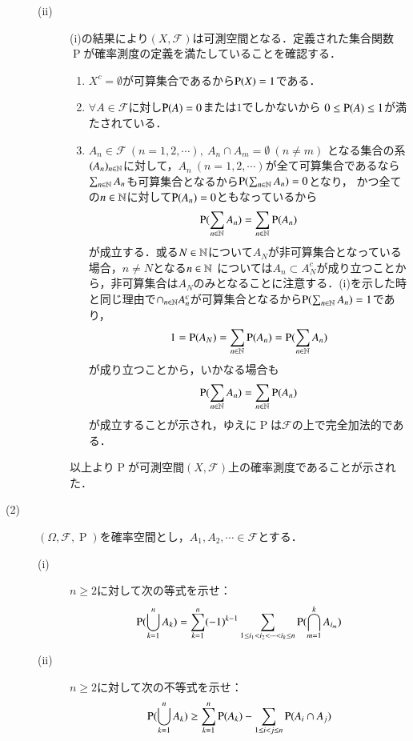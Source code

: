 \begin{description}
\begin{description}
			\item[\rm{(ii)}] (i)の結果により$(X, \mathcal{F})$は可測空間となる．定義された集合関数
				$\operatorname{P}$が確率測度の定義を満たしていることを確認する．
				\begin{enumerate}
					\item $X^c = \emptyset$が可算集合であるから$\operatorname{P} (X)=1$である．
					\item $\forall A \in \mathcal{F}$に対し$\operatorname{P} (A)= 0$または$1$でしかないから
						$0 \leq \operatorname{P} (A) \leq 1$が満たされている．
					\item $A_n \in \mathcal{F}\ (n = 1,2,\cdots),\ A_n \cap A_m = \emptyset\ (n \neq m)$
						となる集合の系$(A_n)_{n \in \mathbb{N}}$に対して，$A_n\ (n=1,2,\cdots)$が全て可算集合であるなら
						$\sum_{n \in \mathbb{N}} A_n$も可算集合となるから$\operatorname{P} (\sum_{n \in \mathbb{N}} A_n) = 0$となり，
						かつ全ての$n \in \mathbb{N}$に対して$\operatorname{P} (A_n)=0$ともなっているから
						\begin{align}
							\operatorname{P} (\sum_{n \in \mathbb{N}} A_n) = \sum_{n \in \mathbb{N}} \operatorname{P} (A_n)
						\end{align}
						が成立する．或る$N \in \mathbb{N}$について$A_N$が非可算集合となっている場合，$n \neq N$となる$n \in \mathbb{N}$
						については$A_n \subset A_N^c$が成り立つことから，非可算集合は$A_N$のみとなることに注意する．(i)を示した時と同じ理由で$\cap_{n \in \mathbb{N}}A_n^c$が可算集合となるから$\operatorname{P} (\sum_{n \in \mathbb{N}}A_n)=1$であり，
						\begin{align}
							1 = \operatorname{P} (A_N) = \sum_{n \in \mathbb{N}} \operatorname{P} (A_n) = \operatorname{P} (\sum_{n \in \mathbb{N}}A_n)
						\end{align}
						が成り立つことから，いかなる場合も
						\begin{align}
							\operatorname{P} (\sum_{n \in \mathbb{N}} A_n) = \sum_{n \in \mathbb{N}} \operatorname{P} (A_n)
						\end{align}
						が成立することが示され，ゆえに$\operatorname{P}$は$\mathcal{F}$の上で完全加法的である．
				\end{enumerate}
				以上より$\operatorname{P}$が可測空間$(X, \mathcal{F})$上の確率測度であることが示された．
				\QED
		\end{description}
	\item[(2)] $(\Omega,\mathcal{F},\operatorname{P})$を確率空間とし，$A_1,A_2,\cdots \in \mathcal{F}$とする．
	\begin{description}
		\item[\rm{(i)}] $n \geq 2$に対して次の等式を示せ：
			\begin{align}
				\operatorname{P} (\bigcup_{k=1}^{n}A_k) = \sum_{k=1}^{n}(-1)^{k-1} \sum_{1 \leq i_1 < i_2 < \cdots < i_k \leq n} \operatorname{P} (\bigcap_{m=1}^{k}A_{i_m}) \label{eq:prob_Q1_1}
			\end{align}
		\item[\rm{(ii)}] $n \geq 2$に対して次の不等式を示せ：
			\begin{align}
				\operatorname{P} (\bigcup_{k=1}^{n} A_k) \geq \sum_{k=1}^{n} \operatorname{P} (A_k) - \sum_{1 \leq i < j \leq n} \operatorname{P} (A_i \cap A_j) \label{eq:prob_Q1_2}
			\end{align}
	\end{description}
	

\end{description}
